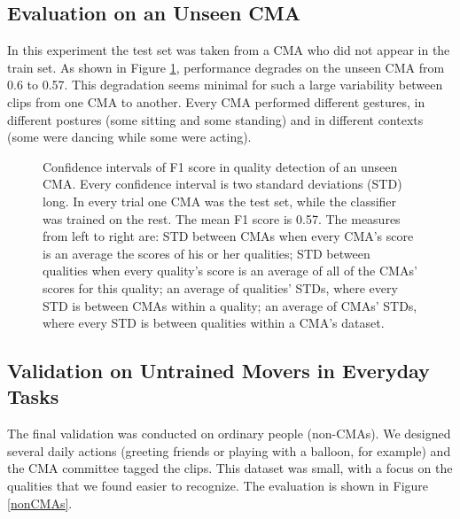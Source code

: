 \documentclass[11pt,twocolumn,varwidth=true,a4paper,fleqn]{sigchi}
\begin{document}
\subsection{Evaluation on an Unseen CMA}
In this experiment the test set was taken from a CMA who did not appear in the train set.
As shown in Figure \ref{domainAdaptationBaseLine}, performance degrades on the unseen CMA from 0.6 to 0.57.
This degradation seems minimal for such a large variability between clips from one CMA to another. Every CMA performed different gestures, in different postures (some sitting and some standing) 
and in different contexts (some were dancing while some were acting).

\begin{figure}[!h]
\centering
{}
\caption{Confidence intervals of F1 score in quality detection of an unseen CMA.
Every confidence interval is two standard deviations (STD) long.
In every trial one CMA was the test set, while the classifier was trained on the rest. The mean F1 score is 0.57. The measures from left to right are: STD between CMAs when every CMA's score is an average the scores of his or her qualities; STD between qualities when every quality's score is an average of all of the CMAs' scores for this quality; an average of qualities' STDs, where every STD is between CMAs within a quality; an average of CMAs' STDs, where every STD is between qualities within a CMA's dataset.}
\label{domainAdaptationBaseLine}
\end{figure}

\subsection{Validation on Untrained Movers in Everyday Tasks}
The final validation was conducted on ordinary people (non-CMAs). We
designed several daily actions (greeting friends or playing with a balloon, for
example) and the CMA committee tagged the clips. This dataset was small, with a
focus on the qualities that we found easier to recognize. The evaluation is shown in Figure \ref{nonCMAs}.
\end{document}
